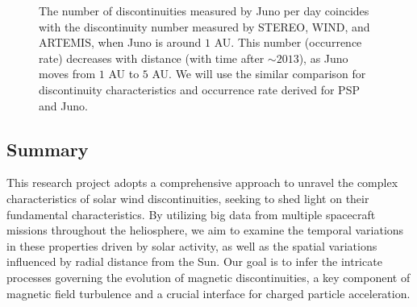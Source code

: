 \documentclass[
  letterpaper,
  DIV=11,
  numbers=noendperiod]{scrartcl}
\begin{document}
\begin{figure}


\caption{\label{fig-rate}The number of discontinuities measured by Juno per day coincides with the discontinuity number measured by STEREO, WIND, and ARTEMIS, when Juno is around \(1\) AU. This number (occurrence rate) decreases with distance (with time after \(\sim 2013\)), as Juno moves from \(1\) AU to \(5\) AU. We will use the similar comparison for discontinuity characteristics and occurrence rate derived for PSP and Juno.}

\end{figure}%

\subsection{Summary}\label{summary}

This research project adopts a comprehensive approach to unravel the complex characteristics of solar wind discontinuities, seeking to shed light on their fundamental characteristics. By utilizing big data from multiple spacecraft missions throughout the heliosphere, we aim to examine the temporal variations in these properties driven by solar activity, as well as the spatial variations influenced by radial distance from the Sun. Our goal is to infer the intricate processes governing the evolution of magnetic discontinuities, a key component of magnetic field turbulence and a crucial interface for charged particle acceleration.
\end{document}

